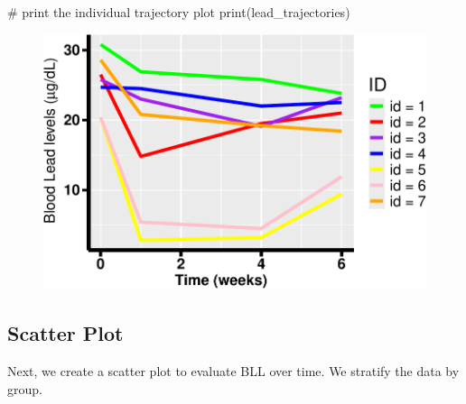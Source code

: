 \documentclass[
  letterpaper,
  DIV=11,
  numbers=noendperiod]{scrreprt}
\newenvironment{Shaded}{\begin{snugshade}}{\end{snugshade}}
\newcommand{\CommentTok}[1]{\textcolor[rgb]{0.37,0.37,0.37}{#1}}
\newcommand{\FunctionTok}[1]{\textcolor[rgb]{0.28,0.35,0.67}{#1}}
\newcommand{\NormalTok}[1]{\textcolor[rgb]{0.00,0.23,0.31}{#1}}
\begin{document}
\begin{Shaded}
\begin{Highlighting}[]
\CommentTok{\# print the individual trajectory plot}
\FunctionTok{print}\NormalTok{(lead\_trajectories)}
\end{Highlighting}
\end{Shaded}

\begin{figure}[H]

{\centering \includegraphics{Longi_EDA_files/figure-pdf/unnamed-chunk-6-1.pdf}

}

\end{figure}

\hypertarget{scatter-plot}{%
\subsection{Scatter Plot}\label{scatter-plot}}

Next, we create a scatter plot to evaluate BLL over time. We stratify
the data by group.
\end{document}
